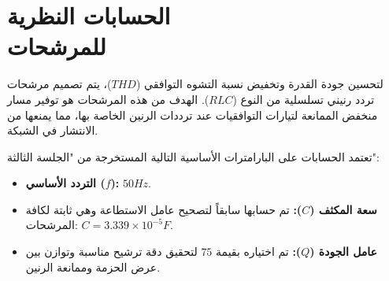 
\section{الحسابات النظرية\\ للمرشحات} \label{part1:sec2}
  {\fontsize{16}{27}\selectfont
  لتحسين جودة القدرة وتخفيض نسبة التشوه التوافقي ($THD$)، يتم تصميم مرشحات تردد رنيني  تسلسلية من النوع ($RLC$). الهدف من هذه المرشحات هو توفير مسار منخفض الممانعة لتيارات التوافقيات عند ترددات الرنين الخاصة بها، مما يمنعها من الانتشار في الشبكة.
  \par}
 \vspace{5pt} 
{\sloppy
\noindent تعتمد الحسابات على البارامترات الأساسية التالية المستخرجة من "الجلسة الثالثة":}
\begin{itemize}
    \item \textbf{التردد الأساسي ($f$):} $50 Hz$.
    \item \textbf{سعة المكثف ($C$):} تم حسابها سابقاً لتصحيح عامل الاستطاعة وهي ثابتة لكافة المرشحات: $C = 3.339 \times 10^{-5} F$.
    \item \textbf{عامل الجودة ($Q$):} تم اختياره بقيمة $75$ لتحقيق دقة ترشيح مناسبة وتوازن بين عرض الحزمة وممانعة الرنين.
\end{itemize}






